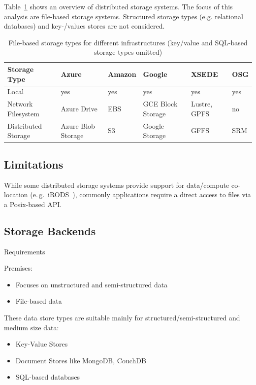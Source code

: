 \documentclass[conference]{IEEEtran}
\begin{document}
Table~\ref{tab:storage-systems} shows an overview of distributed storage 
systems. The focus of this analysis are file-based storage systems. Structured
storage types (e.g. relational databases) and key-/values stores are not 
considered.

\begin{table}[t]
\begin{tabular}{|p{1.3cm}|p{1cm}|p{1cm}|p{1cm}|p{1cm}|p{1cm}|}
	\hline
	\textbf{Storage Type} &\textbf{Azure} &\textbf{Amazon} &\textbf{Google} &\textbf{XSEDE}  &\textbf{OSG} \\
	\hline
	Local	&yes &yes &yes &yes &yes\\
	\hline
	Network Filesystem &Azure Drive &EBS &GCE Block Storage &Lustre, GPFS 
	&no\\
	\hline
	Distributed Storage &Azure Blob Storage &S3 &Google Storage &GFFS
	 &SRM\\
	\hline	
\end{tabular}
\caption{File-based storage types for different infrastructures (key/value and 
SQL-based storage types omitted) \label{tab:storage-systems}}
\end{table}


\subsection{Limitations}
While some distributed storage systems provide support for data/compute 
co-location (e.\,g.\ iRODS~\cite{Rajasekar:2010:IPI:1855046}), commonly 
applications require a direct access to files via a Posix-based API.

\subsection{Storage Backends}

Requirements

Premises:
\begin{itemize}
	\item Focuses on unstructured and semi-structured data
	\item File-based data
\end{itemize}

These data store types are suitable mainly for structured/semi-structured and 
medium size data:
\begin{itemize}
	\item Key-Value Stores
	\item Document Stores like MongoDB, CouchDB 
	\item SQL-based databases
\end{itemize}
\end{document}

